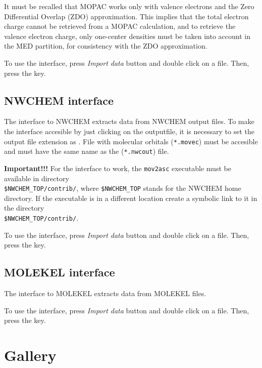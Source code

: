 \documentclass[10pt]{article}
\begin{document}
It must be recalled that MOPAC works only with valence electrons and the 
Zero Differential Overlap (ZDO) approximation.
This implies that the total electron charge cannot be retrieved from a MOPAC calculation,
and to retrieve the valence electron charge, only one-center densities must be taken 
into account in the MED partition, for consistency with the ZDO approximation.

To use the interface, press {\it Import data} button \teclapuntos and double click
on a \aux{ } file. Then, press the \exec key.

\subsection{NWCHEM interface \label{sec:5.6}}

The interface to NWCHEM extracts data from NWCHEM output files. 
To make the interface accesible by just clicking on the outputfile, it is necessary to 
set the output file extension as \nwcout{ }. File with molecular orbitals (\texttt{*.movec})
must be accesible and must have the same name as the (\texttt{*.nwcout}) file.

{\bf Important!!!} For the interface to work, the \texttt{mov2asc} executable must be available in
directory  \\ \texttt{\$NWCHEM\_TOP/contrib/}, where \texttt{\$NWCHEM\_TOP} stands for
the NWCHEM home directory. If the executable is in a different location
create a symbolic link to it in the directory  \\ \texttt{\$NWCHEM\_TOP/contrib/}.

To use the interface, press {\it Import data} button \teclapuntos and double click
on a \nwcout{ } file. Then, press the \exec key.

\subsection{MOLEKEL interface \label{sec:5.7}}

The interface to MOLEKEL extracts data from MOLEKEL \mkl{ } files.

To use the interface, press {\it Import data} button \teclapuntos and double click
on a \mkl{ } file. Then, press the \exec key.



\newpage

\section{Gallery \label{sec:6}}
\end{document}
